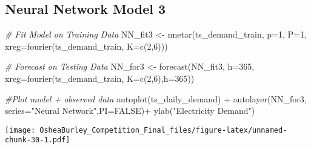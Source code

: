 \documentclass[
]{article}
\newenvironment{Shaded}{\begin{snugshade}}{\end{snugshade}}
\newcommand{\AttributeTok}[1]{\textcolor[rgb]{0.77,0.63,0.00}{#1}}
\newcommand{\CommentTok}[1]{\textcolor[rgb]{0.56,0.35,0.01}{\textit{#1}}}
\newcommand{\ConstantTok}[1]{\textcolor[rgb]{0.00,0.00,0.00}{#1}}
\newcommand{\DecValTok}[1]{\textcolor[rgb]{0.00,0.00,0.81}{#1}}
\newcommand{\FunctionTok}[1]{\textcolor[rgb]{0.00,0.00,0.00}{#1}}
\newcommand{\NormalTok}[1]{#1}
\newcommand{\OtherTok}[1]{\textcolor[rgb]{0.56,0.35,0.01}{#1}}
\newcommand{\SpecialCharTok}[1]{\textcolor[rgb]{0.00,0.00,0.00}{#1}}
\newcommand{\StringTok}[1]{\textcolor[rgb]{0.31,0.60,0.02}{#1}}
\begin{document}
\begin{Shaded}
\end{Shaded}

\hypertarget{neural-network-model-3}{%
\subsection{Neural Network Model 3}\label{neural-network-model-3}}

\begin{Shaded}
\begin{Highlighting}[]
\CommentTok{\# Fit Model on Training Data}
\NormalTok{NN\_fit3 }\OtherTok{\textless{}{-}} \FunctionTok{nnetar}\NormalTok{(ts\_demand\_train,}
                 \AttributeTok{p=}\DecValTok{1}\NormalTok{,}
                 \AttributeTok{P=}\DecValTok{1}\NormalTok{,}
                 \AttributeTok{xreg=}\FunctionTok{fourier}\NormalTok{(ts\_demand\_train, }\AttributeTok{K=}\FunctionTok{c}\NormalTok{(}\DecValTok{2}\NormalTok{,}\DecValTok{6}\NormalTok{)))}

\CommentTok{\# Forecast on Testing Data}
\NormalTok{NN\_for3 }\OtherTok{\textless{}{-}} \FunctionTok{forecast}\NormalTok{(NN\_fit3, }
                   \AttributeTok{h=}\DecValTok{365}\NormalTok{,}
                   \AttributeTok{xreg=}\FunctionTok{fourier}\NormalTok{(ts\_demand\_train, }
                                          \AttributeTok{K=}\FunctionTok{c}\NormalTok{(}\DecValTok{2}\NormalTok{,}\DecValTok{6}\NormalTok{),}\AttributeTok{h=}\DecValTok{365}\NormalTok{))}


\CommentTok{\#Plot model + observed data}
\FunctionTok{autoplot}\NormalTok{(ts\_daily\_demand) }\SpecialCharTok{+}
  \FunctionTok{autolayer}\NormalTok{(NN\_for3, }\AttributeTok{series=}\StringTok{"Neural Network"}\NormalTok{,}\AttributeTok{PI=}\ConstantTok{FALSE}\NormalTok{)}\SpecialCharTok{+}
  \FunctionTok{ylab}\NormalTok{(}\StringTok{"Electricity Demand"}\NormalTok{) }
\end{Highlighting}
\end{Shaded}

\texttt{[image: OsheaBurley\_Competition\_Final\_files/figure-latex/unnamed-chunk-30-1.pdf]}
\end{document}
